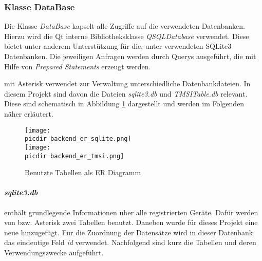\subsubsection*{Klasse DataBase}

Die Klasse \textit{DataBase} kapselt alle Zugriffe auf die verwendeten Datenbanken. Hierzu wird die Qt interne Bibliotheksklasse \textit{QSQLDatabase} verwendet. Diese bietet unter anderem Unterstützung für die, unter \OpenBTS verwendeten SQLite3 Datenbanken. Die jeweiligen Anfragen werden durch \SQL Querys ausgeführt, die mit Hilfe von \textit{Prepared Statements} erzeugt werden.

\OpenBTS mit Asterisk verwendet zur Verwaltung unterschiedliche Datenbankdateien. In diesem Projekt sind davon die Dateien \textit{sqlite3.db} und \textit{TMSITable.db} relevant. Diese sind schematisch in Abbildung \ref{fig:database_er} dargestellt und werden im Folgenden näher erläutert.

\begin{figure}[h!]
	\centering
	\texttt{[image: \\picdir backend\_er\_sqlite.png]} \\
	\texttt{[image: \\picdir backend\_er\_tmsi.png]}
	\caption{Benutzte Tabellen als ER Diagramm}
	\label{fig:database_er}
\end{figure}


\paragraph{\textit{sqlite3.db}} enthält grundlegende Informationen über alle registrierten Geräte. Dafür werden von \OpenBTS bzw. Asterisk zwei Tabellen benutzt. Daneben wurde für dieses Projekt eine neue hinzugefügt. Für die Zuordnung der Datensätze wird in dieser Datenbank das eindeutige Feld \textit{id} verwendet. Nachfolgend sind kurz die Tabellen und deren Verwendungszwecke aufgeführt.

